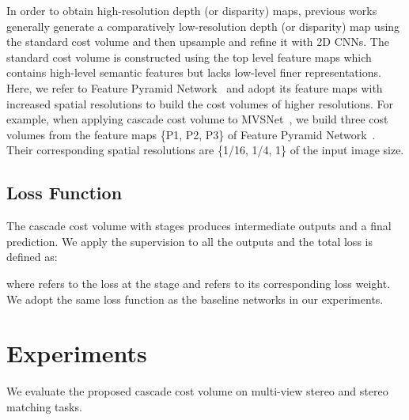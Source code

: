 \documentclass[10pt,twocolumn,letterpaper]{article}
\begin{document}
In order to obtain high-resolution depth (or disparity) maps, previous works~\cite{zhang2019ga, wu2019iccv_semanticstereo, nie2019multi, Luo_2019_ICCV} generally generate a comparatively low-resolution depth (or disparity) map using the standard cost volume and then upsample and refine it with 2D CNNs.
The standard cost volume is constructed using the top level feature maps which contains high-level semantic features but lacks low-level finer representations.
Here, we refer to Feature Pyramid Network~\cite{lin2017feature} and adopt its feature maps with increased spatial resolutions to build the cost volumes of higher resolutions.
For example, when applying cascade cost volume to MVSNet~\cite{yao2018mvsnet}, we build three cost volumes from the feature maps \{P1, P2, P3\} of Feature Pyramid Network~\cite{lin2017feature}.
Their corresponding spatial resolutions are \{1/16, 1/4, 1\} of the input image size.

\subsection{Loss Function}
The cascade cost volume with  stages produces  intermediate outputs and a final prediction.
We apply the supervision to all the outputs and the total loss is defined as:

where  refers to the loss at the  stage and  refers to its corresponding loss weight.
We adopt the same loss function  as the baseline networks in our experiments.


 
\section{Experiments} 
We evaluate the proposed cascade cost volume on multi-view stereo and stereo matching tasks.
\end{document}
